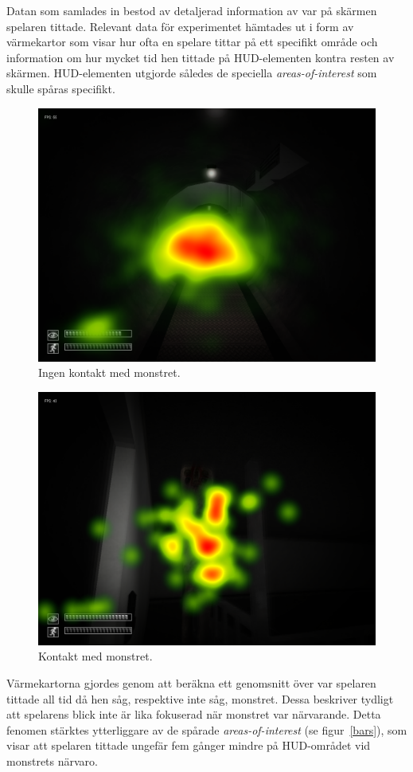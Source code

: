 \documentclass{article}
\begin{document}
Datan som samlades in bestod av detaljerad information av var på skärmen spelaren tittade. Relevant data för experimentet hämtades ut i form av värmekartor som visar hur ofta en spelare tittar på ett specifikt område och information om hur mycket tid hen tittade på HUD-elementen kontra resten av skärmen. HUD-elementen utgjorde således de speciella \textit{areas-of-interest} som skulle spåras specifikt.

\begin{figure}[h!]
    \begin{center}
        \includegraphics*[width=0.65\columnwidth]{experiment/NoContact_Heatmap.png}
        \caption{Ingen kontakt med monstret.}
        \label{no_contact}
    \end{center}
\end{figure}

\begin{figure}[h!]
    \begin{center}
        \includegraphics*[width=0.65\columnwidth]{experiment/Contact_Heatmap.png}
        \caption{Kontakt med monstret.}
        \label{contact}
    \end{center}
\end{figure}

Värmekartorna gjordes genom att beräkna ett genomsnitt över var spelaren tittade all tid då hen såg, respektive inte såg, monstret. Dessa beskriver tydligt att spelarens blick inte är lika fokuserad när monstret var närvarande. Detta fenomen stärktes ytterliggare av de spårade \textit{areas-of-interest} (se figur~\ref{bars}), som visar att spelaren tittade ungefär fem gånger mindre på HUD-området vid monstrets närvaro.
\end{document}
